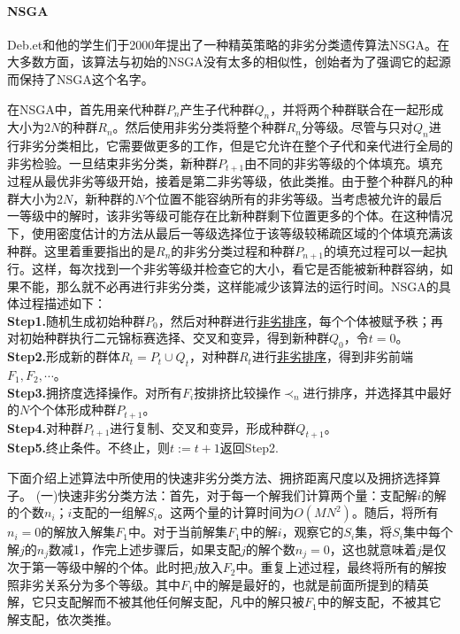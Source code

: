             \paragraph{NSGA}Deb.et和他的学生们于2000年提出了一种精英策略的非劣分类遗传算法NSGA。在大多数方面，该算法与初始的NSGA没有太多的相似性，创始者为了强调它的起源而保持了NSGA这个名字。
            \par
            在NSGA中，首先用亲代种群$P_n$产生子代种群$Q_n$，并将两个种群联合在一起形成大小为$2N$的种群$R_n$。然后使用非劣分类将整个种群$R_n$分等级。尽管与只对$Q_n$进行非劣分类相比，它需要做更多的工作，但是它允许在整个子代和亲代进行全局的非劣检验。一旦结束非劣分类，新种群$P_{t+1}$由不同的非劣等级的个体填充。填充过程从最优非劣等级开始，接着是第二非劣等级，依此类推。由于整个种群凡的种群大小为$2N$，新种群的$N$个位置不能容纳所有的非劣等级。当考虑被允许的最后一等级中的解时，该非劣等级可能存在比新种群剩下位置更多的个体。在这种情况下，使用密度估计的方法从最后一等级选择位于该等级较稀疏区域的个体填充满该种群。这里着重要指出的是$R_n$的非劣分类过程和种群$P_{n+1}$的填充过程可以一起执行。这样，每次找到一个非劣等级并检查它的大小，看它是否能被新种群容纳，如果不能，那么就不必再进行非劣分类，这样能减少该算法的运行时间。NSGA的具体过程描述如下：\\
            \textbf{Step1.}随机生成初始种群$P_0$，然后对种群进行\underline{非劣排序}，每个个体被赋予秩；再对初始种群执行二元锦标赛选择、交叉和变异，得到新种群$Q_0$，令$t=0$。\\
            \textbf{Step2.}形成新的群体$R_t  = P_t\cup Q_t$，对种群$R_t$进行\underline{非劣排序}，得到非劣前端$F_1,F_2,\cdots$。\\
            \textbf{Step3.}拥挤度选择操作。对所有$F_i$按排挤比较操作$\prec_n$进行排序，并选择其中最好的$N$个个体形成种群$P_{t+1}$。\\
            \textbf{Step4.}对种群$P_{t+1}$进行复制、交叉和变异，形成种群$Q_{t+1}$。\\
            \textbf{Step5.}终止条件。不终止，则$t:=t+1$返回Step2.
            \par
            下面介绍上述算法中所使用的快速非劣分类方法、拥挤距离尺度以及拥挤选择算子。
            (一)快速非劣分类方法：首先，对于每一个解我们计算两个量：支配解$i$的解的个数$n_i$；$i$支配的一组解$S_i$。这两个量的计算时间为$O(MN^2)$。随后，将所有$n_i=0$的解放入解集$F_1$中。对于当前解集$F_1$中的解$i$，观察它的$S_i$集，将$S_i$集中每个解$j$的$n_j$数减1，作完上述步骤后，如果支配$j$的解个数$n_j=0$，这也就意味着$j$是仅次于第一等级中解的个体。此时把$j$放入$F_2$中。重复上述过程，最终将所有的解按照非劣关系分为多个等级。其中$F_1$中的解是最好的，也就是前面所提到的精英解，它只支配解而不被其他任何解支配，凡中的解只被$F_1$中的解支配，不被其它解支配，依次类推。
